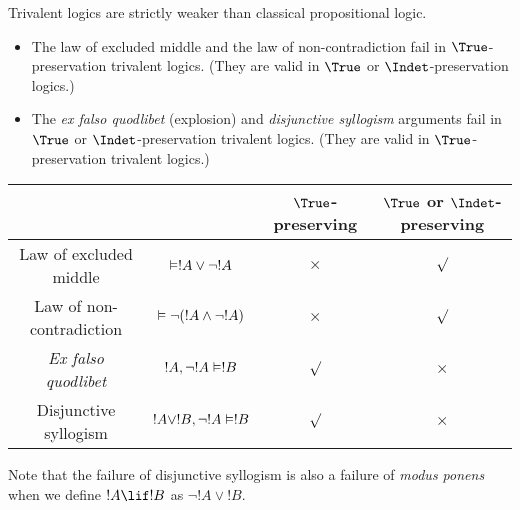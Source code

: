 \documentclass[../../../include/open-logic-section]{subfiles}
\begin{document}
\begin{prop}
 Trivalent logics are strictly weaker than classical propositional logic.
\begin{itemize}
  \item The law of excluded middle and the law of non-contradiction fail in $\True$-preservation trivalent logics. (They are valid in $\True$ or $\Indet$-preservation logics.)
  \item The \emph{ex falso quodlibet} (explosion) and \emph{disjunctive syllogism} arguments fail in $\True$ or $\Indet$-preservation trivalent logics. (They are valid in $\True$-preservation trivalent logics.)
\end{itemize}
\end{prop}

\begin{center}
  \begin{tabular}{|cc|cc|} \hline 
      & & $\True$-preserving & $\True$ or $\Indet$-preserving \\ \hline
    Law of excluded middle & $\Entails !A \lor \lnot !A$ & $\times$ & $\surd$ \\ 
    Law of non-contradiction & $\Entails \lnot (!A \land \lnot !A)$ & $\times$ & $\surd$ \\ 
    \emph{Ex falso quodlibet} & $!A, \lnot !A \Entails !B$ & $\surd$ & $\times$ \\
    Disjunctive syllogism & $!A \lor !B, \lnot !A \Entails !B$ & $\surd$ & $\times$ \\
    \hline 
  \end{tabular}
\end{center}

Note that the failure of disjunctive syllogism is also a failure of \emph{modus ponens} when we define $!A \lif !B$ as $\lnot !A \lor !B$.  
\end{document}
